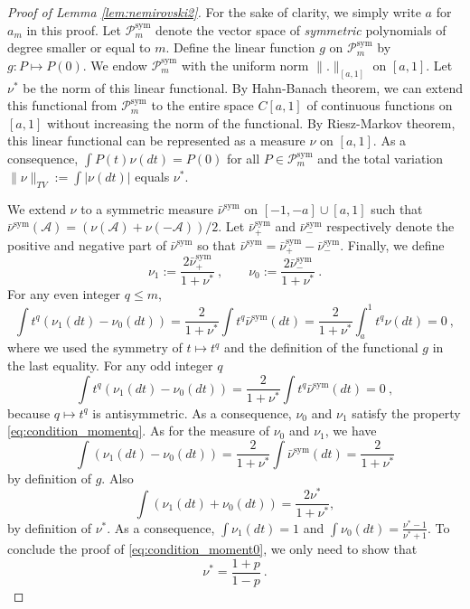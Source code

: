 \documentclass[twoside,11pt]{article}
\def\beq{\begin{equation}}
\def\eeq{\end{equation}}
\def\cA{\mathcal{A}}
\def\cP{\mathcal{P}}
\newcommand{\<}{\langle}
\renewcommand{\>}{\rangle}
\begin{document}
\begin{proof}[Proof of Lemma \ref{lem:nemirovski2}]
 For the sake of clarity, we simply write $a$ for $a_{m}$ in this proof.
 Let $\cP^{\text{sym}}_{m}$ denote the vector space of \textit{symmetric} polynomials of degree smaller or equal to $m$. 
 Define the linear function $g$ on $\cP^{\text{sym}}_{m}$ by $g: P\mapsto P(0)$. We endow $\cP^{\text{sym}}_{m}$ with the uniform norm $\|.\|_{[a,1]}$ on $[a,1]$. Let $\nu^*$ be the norm of this linear functional. By Hahn-Banach theorem, we can extend this functional from $\cP^{\text{sym}}_{m}$ to the entire space $C[a,1]$ of continuous functions on $[a,1]$ without increasing the norm of the functional. By Riesz-Markov theorem, this linear functional can be represented as a measure $\nu$ on $[a,1]$. As a consequence, $\int P(t)\nu(dt)= P(0)$ for all $P\in \cP^{\text{sym}}_m$ and the total variation $\|\nu\|_{TV}:= \int|\nu(dt)|$ equals $\nu^*$. 
 
 We extend $\nu$ to a symmetric measure $\bar{\nu}^{\text{sym}}$ on $[-1,-a]\cup [a,1]$ such that $\bar{\nu}^{\text{sym}}(\cA)= (\nu(\cA)+ \nu(-\cA))/2$. Let $\bar{\nu}^{\text{sym}}_+$ and $\bar{\nu}^{\text{sym}}_-$ respectively denote the positive and negative part of $\bar{\nu}^{\text{sym}}$ so that  $\bar{\nu}^{\text{sym}}=\bar{\nu}^{\text{sym}}_+- \bar{\nu}^{\text{sym}}_-$. Finally, we define 
 \[\nu_1:= \frac{2\bar{\nu}^{\text{sym}}_+}{1+\nu^*}\ , \quad \quad \nu_0:= \frac{2\bar{\nu}^{\text{sym}}_-}{1+\nu^*}\ .\]
 For any even integer $q\leq m$, 
 \[
 \int t^q (\nu_1(dt)-\nu_0(dt))= \frac{2}{1+\nu^*}\int t^q \bar{\nu}^{\text{sym}}(dt)= \frac{2}{1+\nu^*}\int_{a}^{1} t^q \nu(dt)=0\ ,
 \]
where we used the symmetry of $t\mapsto t^{q}$ and the definition of the functional $g$ in the last equality. For any odd integer $q$
\[
 \int t^q (\nu_1(dt)-\nu_0(dt))= \frac{2}{1+\nu^*}\int t^q \bar{\nu}^{\text{sym}}(dt)= 0\ ,
\]
 because $q\mapsto t^{q}$ is antisymmetric. As a consequence, $\nu_0$ and $\nu_1$ satisfy the property \eqref{eq:condition_momentq}. As for the measure of $\nu_0$ and $\nu_1$, we have 
 \[\int (\nu_1(dt)-\nu_0(dt))=  \frac{2}{1+\nu^*}\int  \bar{\nu}^{\text{sym}}(dt)= \frac{2}{1+\nu^*}\]
 by definition of $g$. Also 
$$\int (\nu_1(dt)+\nu_0(dt))=  \frac{2\nu^*}{1+\nu^*},$$
by definition of $\nu^*$. As a consequence, $\int \nu_1(dt)= 1$ and $\int \nu_0(dt)= \frac{\nu^*-1}{\nu^*+1}$. To conclude the proof of \eqref{eq:condition_moment0}, we only need to show that 
 \beq\label{eq:objective_nu*}
 \nu^*= \frac{1+p}{1-p}\ .
 \eeq
 

\end{proof}
\end{document}
